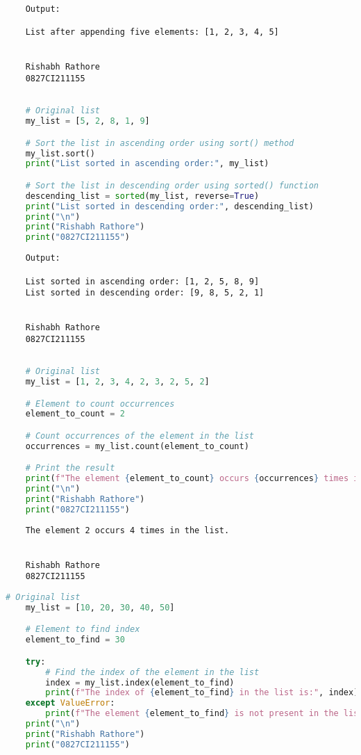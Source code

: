 \documentclass{report}
\begin{document}
\begin{verbatim}
	Output:

	List after appending five elements: [1, 2, 3, 4, 5]


	Rishabh Rathore
	0827CI211155
\end{verbatim}
\bigskip


\sol{}
\begin{lstlisting}[language=Python]

	# Original list
	my_list = [5, 2, 8, 1, 9]

	# Sort the list in ascending order using sort() method
	my_list.sort()
	print("List sorted in ascending order:", my_list)

	# Sort the list in descending order using sorted() function
	descending_list = sorted(my_list, reverse=True)
	print("List sorted in descending order:", descending_list)
	print("\n")
	print("Rishabh Rathore")
	print("0827CI211155")
\end{lstlisting}

\begin{verbatim}
	Output:

	List sorted in ascending order: [1, 2, 5, 8, 9]
	List sorted in descending order: [9, 8, 5, 2, 1]
	
	
	Rishabh Rathore
	0827CI211155
\end{verbatim}
\bigskip


\sol{}
\begin{lstlisting}[language=Python]

	# Original list
	my_list = [1, 2, 3, 4, 2, 3, 2, 5, 2]

	# Element to count occurrences
	element_to_count = 2

	# Count occurrences of the element in the list
	occurrences = my_list.count(element_to_count)

	# Print the result
	print(f"The element {element_to_count} occurs {occurrences} times in the list.")
	print("\n")
	print("Rishabh Rathore")
	print("0827CI211155")
\end{lstlisting}

\begin{verbatim}
	The element 2 occurs 4 times in the list.


	Rishabh Rathore
	0827CI211155
\end{verbatim}
\bigskip


\sol{}
\begin{lstlisting}[language=Python]
	# Original list
	my_list = [10, 20, 30, 40, 50]

	# Element to find index
	element_to_find = 30

	try:
		# Find the index of the element in the list
		index = my_list.index(element_to_find)
		print(f"The index of {element_to_find} in the list is:", index)
	except ValueError:
		print(f"The element {element_to_find} is not present in the list.")
	print("\n")
	print("Rishabh Rathore")
	print("0827CI211155")
\end{lstlisting}
\end{document}
